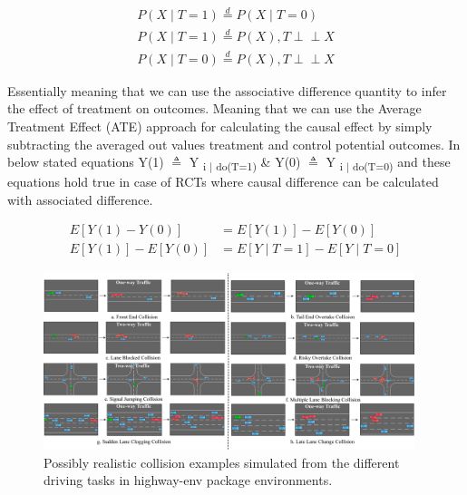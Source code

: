 \documentclass[a4, conference]{IEEEtran}
\begin{document}
    \begin{equation}
        \begin{alignedat}{3}
            P(X \mid T=1) \stackrel{d}{=} P(X \mid T=0) \\
            P(X \mid T=1) \stackrel{d}{=} P(X),  T \perp\!\!\!\perp X \\
            P(X \mid T=0) \stackrel{d}{=} P(X), T \perp\!\!\!\perp X
        \end{alignedat}
    \end{equation}

    Essentially meaning that we can use the associative difference quantity to infer the effect of treatment on outcomes. Meaning that we can use the Average Treatment Effect (ATE) approach for calculating the causal effect by simply subtracting the averaged out values treatment and control potential outcomes. In below stated equations Y(1) $\triangleq$ Y\textsubscript{ i $\mid$ do(T=1)} \& Y(0) $\triangleq$ Y\textsubscript{ i $\mid$ do(T=0)} and these equations hold true in case of RCTs where causal difference can be calculated with associated difference.

    \begin{equation}
        \begin{alignedat}{2}\label{ate}
            E[Y(1)-Y(0)] &= E[Y(1)]-E[Y(0)] \\
            E[Y(1)]-E[Y(0)] &= E[Y\mid T=1]-E[Y\mid T=0] 
        \end{alignedat}
    \end{equation}

    \begin{figure}
        \centering
        \includegraphics[width=0.965\textwidth]{collision-summary-diagram.png}
        \caption{Possibly realistic collision examples simulated from the different driving tasks in highway-env package environments.}
        \label{fig3}
    \end{figure}
\end{document}
